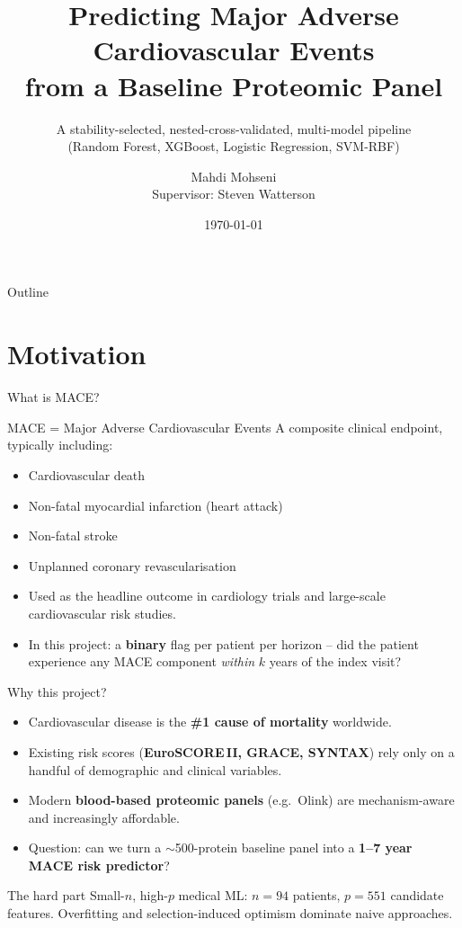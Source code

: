 \documentclass[10pt,aspectratio=169]{beamer}
\title[MACE Risk Prediction]{Predicting Major Adverse Cardiovascular Events\\
from a Baseline Proteomic Panel}
\subtitle{A stability-selected, nested-cross-validated, multi-model pipeline\\
(Random Forest, XGBoost, Logistic Regression, SVM-RBF)}
\author[M. Mohseni]{Mahdi Mohseni \\ \scriptsize Supervisor: Steven Watterson}
\institute[]{MACE Risk-Prediction Project}
\date{\today}
\begin{document}
\begin{frame}
  \titlepage
\end{frame}

\begin{frame}{Outline}
  \tableofcontents
\end{frame}

\section{Motivation}

\begin{frame}{What is MACE?}
  \begin{block}{MACE = Major Adverse Cardiovascular Events}
    A composite clinical endpoint, typically including:
    \begin{itemize}
      \item Cardiovascular death
      \item Non-fatal myocardial infarction (heart attack)
      \item Non-fatal stroke
      \item Unplanned coronary revascularisation
    \end{itemize}
  \end{block}
  \begin{itemize}
    \item Used as the headline outcome in cardiology trials and
          large-scale cardiovascular risk studies.
    \item In this project: a \textbf{binary} flag per patient per
          horizon -- did the patient experience any MACE component
          \emph{within} $k$ years of the index visit?
  \end{itemize}
\end{frame}

\begin{frame}{Why this project?}
  \begin{itemize}
    \item Cardiovascular disease is the \textbf{\#1 cause of mortality} worldwide.
    \item Existing risk scores (\textbf{EuroSCORE\,II, GRACE, SYNTAX})
          rely only on a handful of demographic and clinical variables.
    \item Modern \textbf{blood-based proteomic panels} (e.g.\ Olink) are
          mechanism-aware and increasingly affordable.
    \item Question: can we turn a $\sim$500-protein baseline panel into a
          \textbf{1--7 year MACE risk predictor}?
  \end{itemize}
  \begin{block}{The hard part}
    Small-$n$, high-$p$ medical ML: $n=94$ patients, $p=551$ candidate
    features. Overfitting and selection-induced optimism dominate naive
    approaches.
  \end{block}
\end{frame}
\end{document}

